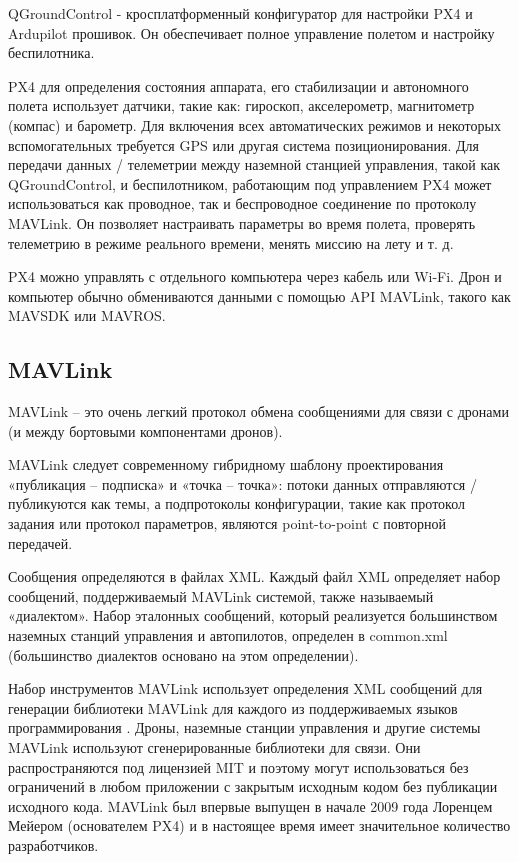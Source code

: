 QGroundControl - кросплатформенный конфигуратор для настройки PX4 и Ardupilot прошивок. Он обеспечивает полное управление полетом и настройку беспилотника. \cite{qgroundcontrol}

PX4 для определения состояния аппарата, его стабилизации и автономного полета использует датчики, такие как: гироскоп, акселерометр, магнитометр (компас) и барометр. Для включения всех автоматических режимов и некоторых вспомогательных требуется GPS или другая система позиционирования.
Для передачи данных / телеметрии между наземной станцией управления, такой как Q\-Ground\-Control, и беспилотником, работающим под управлением PX4 может использоваться как проводное, так и беспроводное соединение по протоколу MAVLink. Он позволяет настраивать параметры во время полета, проверять телеметрию в режиме реального времени, менять миссию на лету и т. д.

PX4 можно управлять с отдельного компьютера через кабель или Wi-Fi. Дрон и компьютер обычно обмениваются данными с помощью API MAVLink, такого как MAVSDK или MAVROS.
\cite{px4}

\subsection{MAVLink}


MAVLink -- это очень легкий протокол обмена сообщениями для связи с дронами (и между бортовыми компонентами дронов).

MAVLink следует современному гибридному шаблону проектирования «публикация -- подписка» и «точка -- точка»: потоки данных отправляются / публикуются как темы, а подпротоколы конфигурации, такие как протокол задания или протокол параметров, являются point-to-point с повторной передачей.

Сообщения определяются в файлах XML. Каждый файл XML определяет набор сообщений, поддерживаемый MAVLink системой, также называемый «диалектом». Набор эталонных сообщений, который реализуется большинством наземных станций управления и автопилотов, определен в common.xml (большинство диалектов основано на этом определении).

Набор инструментов MAVLink использует определения XML сообщений для генерации библиотеки MAVLink для каждого из поддерживаемых языков программирования . Дроны, наземные станции управления и другие системы MAVLink используют сгенерированные библиотеки для связи. Они распространяются под лицензией MIT и поэтому могут использоваться без ограничений в любом приложении с закрытым исходным кодом без публикации исходного кода. MAVLink был впервые выпущен в начале 2009 года Лоренцем Мейером (основателем PX4) и в настоящее время имеет значительное количество разработчиков.

